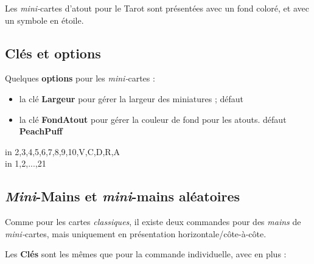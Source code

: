 \documentclass{article}
\newcommand\Cle[1]{{\bfseries\sffamily\textlangle #1\textrangle}}
\begin{document}
{{{{{{{\begin{codeinfo}
Les \textit{mini-}cartes d'atout pour le Tarot sont présentées avec un fond coloré, et avec un symbole en étoile.
\end{codeinfo}

\subsection{Clés et options}

\begin{codecles}
Quelques \Cle{options} pour les \textit{mini-}cartes :

\begin{itemize}
	\item la clé \Cle{Largeur} pour gérer la largeur des miniatures ; \hfill{}défaut \Cle{0.55cm}
	\item la clé \Cle{FondAtout} pour gérer la couleur de fond pour les atouts. \hfill{}défaut \Cle{PeachPuff}
\end{itemize}
\end{codecles}

\begin{codetex}[]
\foreach \EECARTE in {2,3,4,5,6,7,8,9,10,V,C,D,R,A}{}\\
%
\foreach \EECARTE in {1,2,...,21}{}
\end{codetex}

\subsection{\textit{Mini}-Mains et \textit{mini}-mains aléatoires}

\begin{codeidee}
Comme pour les cartes \textit{classiques}, il existe deux commandes pour des \textit{mains} de \textit{mini-}cartes, mais uniquement en présentation horizontale/côte-à-côte.
\end{codeidee}

\begin{codetex}

\end{codetex}

\begin{codecles}
Les \Cle{Clés} sont les mêmes que pour la commande individuelle, avec en plus :


\end{codecles}}}}}}}}
\end{document}
